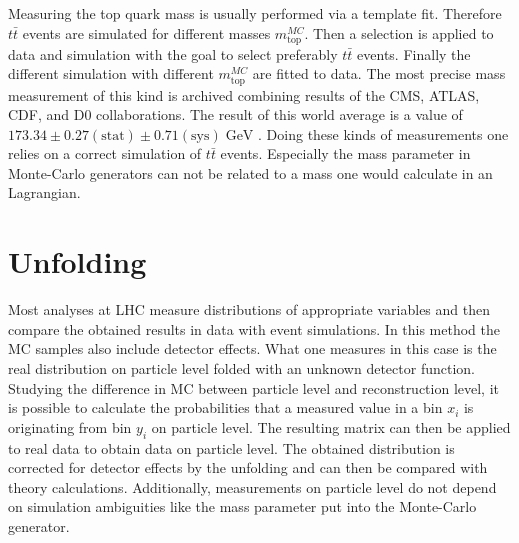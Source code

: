 	
	Measuring the top quark mass is usually performed via a template fit. Therefore $t\bar{t}$ events are simulated for different masses $m_\text{top}^{MC}$. Then a selection is applied to data and simulation with the goal to select preferably $t\bar{t}$ events. Finally the different simulation with different $m_\text{top}^{MC}$ are fitted to data.	The most precise mass measurement of this kind is archived combining results of the CMS, ATLAS, CDF, and D0 collaborations. The result of this world average is a value of $173.34 \pm 0.27 (\text{stat}) \pm 0.71 (\text{sys})\;\text{GeV}$ \cite{topmass_combination}. Doing these kinds of measurements one relies on a correct simulation of $t\bar{t}$ events. Especially the mass parameter in Monte-Carlo generators can not be related to a mass one would calculate in an Lagrangian.
\section{Unfolding}
	Most analyses at LHC measure distributions of appropriate variables and then compare the obtained results in data with event simulations. In this method the MC samples also include detector effects. What one measures in this case is the real distribution on particle level folded with an unknown detector function. Studying the difference in MC between particle level and reconstruction level, it is possible to calculate the probabilities that a measured value in a bin $x_i$ is originating from bin $y_i$ on particle level. The resulting matrix can then be applied to real data to obtain data on particle level. The obtained distribution is corrected for detector effects by the unfolding and can then be compared with theory calculations. Additionally, measurements on particle level do not depend on simulation ambiguities like the mass parameter put into the Monte-Carlo generator.

	
